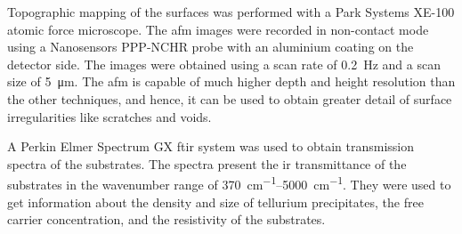 Topographic mapping of the surfaces was performed with a Park Systems XE-100 atomic force microscope. The \ac{afm} images were recorded in non-contact mode using a Nanosensors PPP-NCHR probe with an aluminium coating on the detector side. The images were obtained using a scan rate of \SI{0.2}{\hertz} and a scan size of \SI{5}{\micro\metre}. The \ac{afm} is capable of much higher depth and height resolution than the other techniques, and hence, it can be used to obtain greater detail of surface irregularities like scratches and voids.

A Perkin Elmer Spectrum GX \ac{ftir} system was used to obtain transmission spectra of the substrates. The spectra present the \ac{ir} transmittance of the substrates in the wavenumber range of \SIrange{370}{5000}{\centi\metre^{-1}}. They were used to get information about the density and size of tellurium precipitates, the free carrier concentration, and the resistivity of the substrates. %

